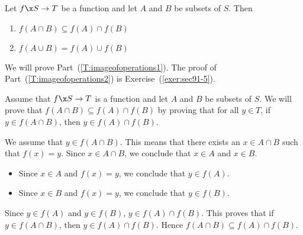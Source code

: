 \begin{theorem} \label{T:imageofoperations}
Let $f\x S \to T$ be a function and let $A$ and $B$ be subsets of $S$.  Then
\begin{enumerate}
\item $f ( A \cap B ) \subseteq f ( A ) \cap f ( B )$
\label{T:imageofoperations1}
%

\item $f ( A \cup B ) = f ( A ) \cup f ( B )$
\label{T:imageofoperations2}
%
\end{enumerate}
\end{theorem}
%
\begin{myproof}
We will prove Part~(\ref{T:imageofoperations1}).  The proof of 
Part~(\ref{T:imageofoperations2}) is Exercise~(\ref{exer:sec91-5}).

Assume that $f\x S \to T$ is a function and let $A$ and $B$ be subsets of $S$.  We will prove that $f ( A \cap B ) \subseteq f ( A ) \cap f ( B )$ by proving that for all $y \in T$, if $y \in f ( A \cap B )$, then 
$y \in f ( A ) \cap f ( B )$.

We assume that $y \in f ( A \cap B )$.  This means that there exists an 
$x \in A \cap B$ such that $f ( x ) = y$.  Since $x \in A \cap B$, we conclude that 
$x \in A$ and $x \in B$.

\begin{itemize}
\item Since $x \in A$ and $f ( x ) = y$, we conclude that $y \in f ( A )$.

\item Since $x \in B$ and $f ( x ) = y$, we conclude that $y \in f ( B )$.
\end{itemize}
Since $y \in f ( A )$ and $y \in f ( B )$,  
$y \in f ( A ) \cap f ( B )$.  This proves that if 
$y \in f ( A \cap B )$, then $y \in f ( A ) \cap f ( B )$.  Hence $f ( A \cap B ) \subseteq f ( A ) \cap f ( B )$.
\end{myproof}
%
\eighth

